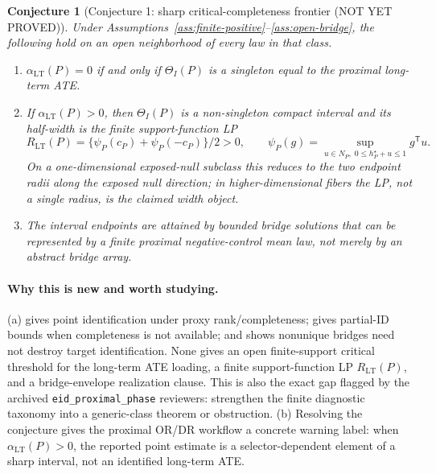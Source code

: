 \documentclass[11pt]{article}
\newcommand{\transpose}{\mathsf{T}}
\theoremstyle{definition}
\theoremstyle{plain}
\newtheorem{conjecture}{Conjecture}
\theoremstyle{remark}
\begin{document}
\begin{conjecture}[Conjecture 1: sharp critical-completeness frontier (NOT YET PROVED)]\label{conj:critical-frontier}
Under Assumptions~\ref{ass:finite-positive}--\ref{ass:open-bridge}, the
following hold on an open neighborhood of every law in that class.
\begin{enumerate}[label=(\roman*)]
\item \(\alpha_{\mathrm{LT}}(P)=0\) if and only if \(\Theta_I(P)\) is a
singleton equal to the proximal long-term ATE.
\item If \(\alpha_{\mathrm{LT}}(P)>0\), then \(\Theta_I(P)\) is a non-singleton
compact interval and its half-width is the finite support-function LP
\[
  R_{\mathrm{LT}}(P)=\{\psi_P(c_P)+\psi_P(-c_P)\}/2>0,
  \qquad
  \psi_P(g)=\sup_{u\in N_P,\;0\le h_P^\star+u\le1}g^\transpose u .
\]
On a one-dimensional exposed-null subclass this reduces to the two endpoint
radii along the exposed null direction; in higher-dimensional fibers the LP,
not a single radius, is the claimed width object.
\item The interval endpoints are attained by bounded bridge solutions that can
be represented by a finite proximal negative-control mean law, not merely by an
abstract bridge array.
\end{enumerate}
\end{conjecture}

\paragraph{Why this is new and worth studying.}
(a) \citet[Sections 2--4]{MiaoGengTchetgen2018} gives point identification
under proxy rank/completeness; \citet[Abstract and Section 3]{GhassamiShpitserTchetgen2023}
gives partial-ID bounds when completeness is not available; and
\citet[Section 2 and Section 3]{ZhangLiMiaoTchetgen2023} shows nonunique
bridges need not destroy target identification.  None gives an open
finite-support critical threshold for the long-term ATE loading, a finite
support-function LP \(R_{\mathrm{LT}}(P)\), and a bridge-envelope realization
clause.  This is also the exact gap flagged by the archived
\texttt{eid\_proximal\_phase} reviewers: strengthen the finite diagnostic
taxonomy into a generic-class theorem or obstruction.  (b) Resolving the
conjecture gives the \citet[Theorem 3.1 and equation (9)]{CuiPuShiMiaoTchetgen2024}
proximal OR/DR workflow a concrete warning label: when
\(\alpha_{\mathrm{LT}}(P)>0\), the reported point estimate is a
selector-dependent element of a sharp interval, not an identified long-term ATE.
\end{document}
